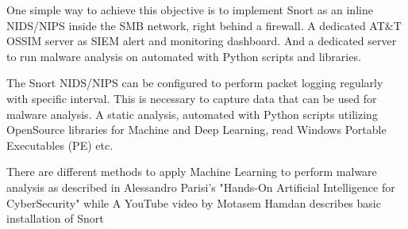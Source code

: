 One simple way to achieve this objective is to implement Snort as an inline NIDS/NIPS inside the SMB network, right behind a firewall. A dedicated AT\&T OSSIM server as SIEM alert and monitoring dashboard. And a dedicated server to run malware analysis on automated with Python scripts and libraries.

The Snort NIDS/NIPS can be configured to perform packet logging regularly with specific interval. This is necessary to capture data that can be used for malware analysis. A static analysis, automated with Python scripts utilizing OpenSource libraries for Machine and Deep Learning, read Windows Portable Executables (PE) etc.

There are different methods to apply Machine Learning to perform malware analysis as described in Alessandro Parisi's "Hands-On Artificial Intelligence for CyberSecurity"\cite{Parisi2019} while A YouTube video by Motasem Hamdan describes basic installation of Snort\cite{YouTube2022_HamdanM}\\